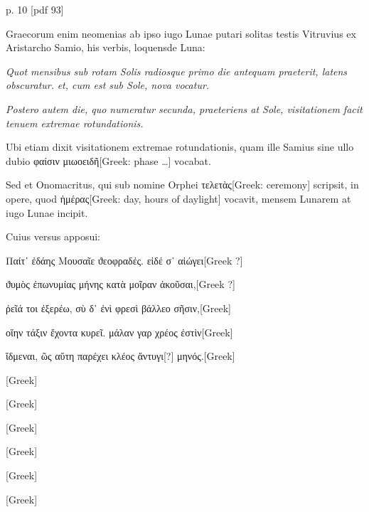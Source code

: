p. 10 [pdf 93]

Graecorum enim neomenias ab ipso iugo
Lunae putari solitas testis Vitruvius ex Aristarcho Samio, his verbis,
loquensde Luna:

\textit{Quot mensibus sub rotam Solis radiosque primo die
antequam praeterit, latens obscuratur.}
 \textit{et, cum est sub Sole, nova vocatur.}

\textit{Postero autem die, quo numeratur secunda,
 praeteriens at Sole, visitationem
facit tenuem extremae rotundationis.}

Ubi etiam dixit visitationem
extremae rotundationis, quam ille Samius sine ullo dubio
 \textgreek{φαίσιν μιωοειδῆ[Greek: phase …]} vocabat.

Sed et Onomacritus, qui sub nomine Orphei \textgreek{τελετὰς[Greek: ceremony]}
scripsit, in opere, quod
 \textgreek{ἡμέρας[Greek: day, hours of daylight]}
 vocavit, mensem Lunarem at iugo Lunae
incipit.

Cuius versus apposui:

\begin{greek}
Παίτ᾽ ἐδάης Μουσαῖε ϑεοφραδἐς. εἰδέ σ᾽ αἰώγει[Greek ?]

ϑυμὸς ἐπωνυμίας μήνης κατὰ μοῖραν ἀκοῦσαι,[Greek ?]

ῤεῖά τοι ἐξερέω, σὺ δ᾽ ἐνὶ φρεσὶ βάλλεο σῆσιν,[Greek]

οἵην τάξιν ἔχοντα κυρεῖ. μάλαν γαρ χρέος ἐστὶν[Greek]

ἴδμεναι, ῶς αὕτη παρέχει κλέος ἄντυγι[?] μηνός.[Greek]

\textgreek{[Greek]}

\textgreek{[Greek]}

\textgreek{[Greek]}

\textgreek{[Greek]}

\textgreek{[Greek]}

\textgreek{[Greek]}
\end{greek}

